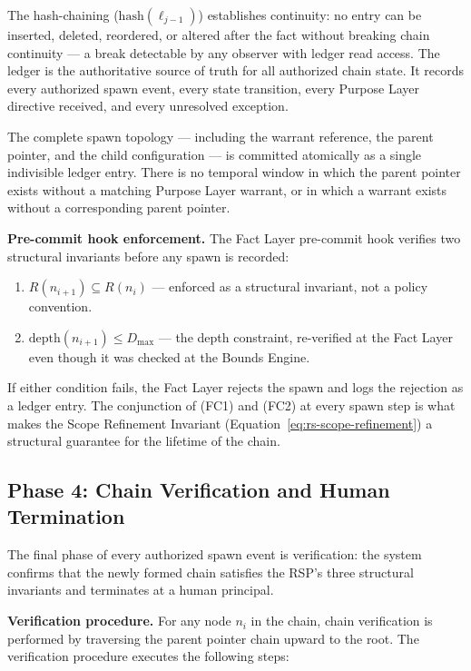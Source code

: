 The hash-chaining ($\text{hash}(\ell_{j-1})$) establishes continuity: no entry can be inserted, deleted, reordered, or altered after the fact without breaking chain continuity — a break detectable by any observer with ledger read access. The ledger is the authoritative source of truth for all authorized chain state. It records every authorized spawn event, every state transition, every Purpose Layer directive received, and every unresolved exception.

The complete spawn topology — including the warrant reference, the parent pointer, and the child configuration — is committed atomically as a single indivisible ledger entry. There is no temporal window in which the parent pointer exists without a matching Purpose Layer warrant, or in which a warrant exists without a corresponding parent pointer.

\medskip
\noindent\textbf{Pre-commit hook enforcement.} The Fact Layer pre-commit hook verifies two structural invariants before any spawn is recorded:

\begin{enumerate}
    \item[(FC1)] $R(n_{i+1}) \subseteq R(n_i)$ — enforced as a structural invariant, not a policy convention.
    \item[(FC2)] $\text{depth}(n_{i+1}) \leq D_{\max}$ — the depth constraint, re-verified at the Fact Layer even though it was checked at the Bounds Engine.
\end{enumerate}

If either condition fails, the Fact Layer rejects the spawn and logs the rejection as a ledger entry. The conjunction of (FC1) and (FC2) at every spawn step is what makes the Scope Refinement Invariant (Equation~\ref{eq:rs-scope-refinement}) a structural guarantee for the lifetime of the chain.

\subsection{Phase 4: Chain Verification and Human Termination}

The final phase of every authorized spawn event is verification: the system confirms that the newly formed chain satisfies the RSP's three structural invariants and terminates at a human principal.

\medskip
\noindent\textbf{Verification procedure.} For any node $n_i$ in the chain, chain verification is performed by traversing the parent pointer chain upward to the root. The verification procedure executes the following steps:

